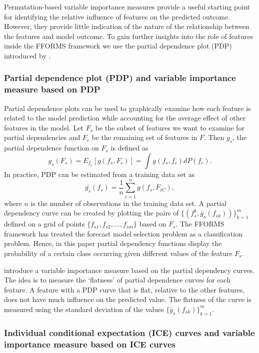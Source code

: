 \documentclass[11pt,a4paper,]{article}
\begin{document}
Permutation-based variable importance measures provide a useful starting point for identifying the relative influence of features on the predicted outcome. However, they provide little indication of the nature of the relationship between the features and model outcome. To gain further insights into the role of features inside the FFORMS framework we use the partial dependence plot (PDP) introduced by \textcite{friedman2008predictive}.

\hypertarget{partial-dependence-plot-pdp-and-variable-importance-measure-based-on-pdp}{%
\subsubsection{Partial dependence plot (PDP) and variable importance measure based on PDP}\label{partial-dependence-plot-pdp-and-variable-importance-measure-based-on-pdp}}

Partial dependence plots can be used to graphically examine how each feature is related to the model prediction while accounting for the average effect of other features in the model. Let \(F_s\) be the subset of features we want to examine for partial dependencies and \(F_c\) be the remaining set of features in \(F\). Then \(g_s\), the partial dependence function on \(F_s\) is defined as
\[g_s(F_s)=E_{f_c}[g(f_s, F_c)]=\int{g(f_s, f_c)dP(f_c).}\]
In practice, PDP can be estimated from a training data set as
\[\bar{g_s}(f_s)=\frac{1}{n}\sum_{i=1}^{n}g(f_s, F_{iC}),\]
where \(n\) is the number of observations in the training data set. A partial dependency curve can be created by plotting the pairs of \(\{(f_s^k, \bar{g}_s(f_{sk}))\}_{k=1}^{m}\) defined on a grid of points \(\{f_{s1}, f_{s2},\dots, f_{sm}\}\) based on \(F_s\). The FFORMS framework has treated the forecast model selection problem as a classification problem. Hence, in this paper partial dependency functions display the probability of a certain class occurring given different values of the feature \(F_s\).

\textcite{Greenwell2018} introduce a variable importance measure based on the partial dependency curves. The idea is to measure the `flatness' of partial dependence curves for each feature. A feature with a PDP curve that is flat, relative to the other features, does not have much influence on the predicted value. The flatness of the curve is measured using the standard deviation of the values \(\{\bar{g}_{s}(f_{sk})\}_{k=1}^{m}\).

\hypertarget{individual-conditional-expectation-ice-curves-and-variable-importance-measure-based-on-ice-curves}{%
\subsubsection{Individual conditional expectation (ICE) curves and variable importance measure based on ICE curves}\label{individual-conditional-expectation-ice-curves-and-variable-importance-measure-based-on-ice-curves}}
\end{document}
